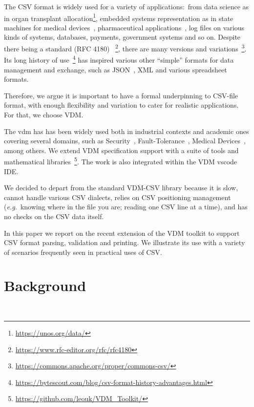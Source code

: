 \documentclass[runningheads,a4paper]{llncs}
\begin{document}
The \gls{CSV} format is widely used for a variety of applications:~from data science as in organ transplant allocation\footnote{\url{https://unos.org/data/}}, embedded systems representation as in state machines for medical devices~\cite{alastairMSc,scp-dialyser}, pharmaceutical applications~\cite{csv-validation-pharma-msc}, log files on various kinds of systems, databases, payments, government systems and so on. Despite there being a standard (RFC 4180) ~\footnote{\url{https://www.rfc-editor.org/rfc/rfc4180}}, there are many versions and variations~\footnote{\url{https://commons.apache.org/proper/commons-csv/}}. Its long history of use~\footnote{\url{https://bytescout.com/blog/csv-format-history-advantages.html}} has inspired various other ``simple'' formats for data management and exchange, such as JSON~\cite{JSON}, XML and various spreadsheet formats. 
 
Therefore, we argue it is important to have a formal underpinning to CSV-file format, with enough flexibility and variation to cater for realistic applications. For that, we choose VDM. 

The \gls{vdm} has has been widely used both in industrial contexts and academic ones covering several domains, such as Security~\cite{Kulik&20,Kulik&21a}, Fault-Tolerance~\cite{Nilsson&18}, Medical Devices~\cite{Macedo&08}, among others. We extend VDM specification support with a suite of tools and mathematical libraries~\footnote{\url{https://github.com/leouk/VDM_Toolkit/}}. The work is also integrated within the VDM \gls{vscode} IDE.

We decided to depart from the standard VDM-CSV library because it is slow, cannot handle various CSV dialects, relies on CSV positioning management (\textit{e.g.}~knowing where in the file you are; reading one CSV line at a time), and has no checks on the CSV data itself.        

In this paper we report on the recent extension of the VDM toolkit to support CSV format parsing, validation and printing. We illustrate its use with a variety of scenarios frequently seen in practical uses of CSV.       

\section{Background}~\label{sec:background}
\end{document}
